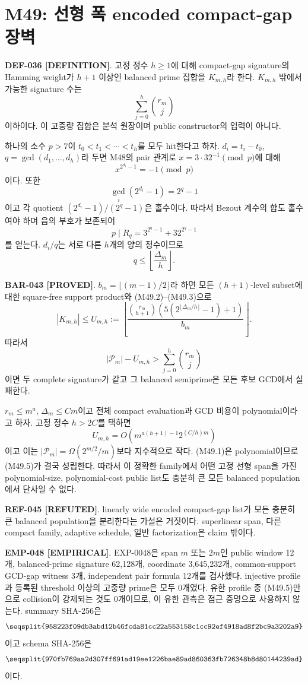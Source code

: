 \documentclass[11pt]{article}
\newcommand{\claimstatus}[2]{\textbf{#1 [#2]}}
\begin{document}
\section{M49: 선형 폭 encoded compact-gap 장벽}

\claimstatus{DEF-036}{DEFINITION}.
고정 정수 \(h\ge1\)에 대해 compact-gap signature의 Hamming weight가
\(h+1\) 이상인 balanced prime 집합을 \(K_{m,h}\)라 한다.
\(K_{m,h}\) 밖에서 가능한 signature 수는
\[
\sum_{j=0}^{h}\binom{r_m}{j}
\tag{M49.1}
\]
이하이다. 이 고중량 집합은 분석 원장이며 public constructor의
입력이 아니다.

하나의 소수 \(p>7\)이
\(t_0<t_1<\cdots<t_h\)를 모두 hit한다고 하자.
\(d_i=t_i-t_0\), \(q=\gcd(d_1,\ldots,d_h)\)라 두면 M48의 pair
관계로 \(x=3\cdot32^{-1}\pmod p\)에 대해
\[
x^{2^{d_i}-1}=-1\pmod p
\]
이다. 또한
\[
\gcd_i(2^{d_i}-1)=2^q-1
\]
이고 각 quotient \((2^{d_i}-1)/(2^q-1)\)은 홀수이다. 따라서
Bezout 계수의 합도 홀수여야 하며 음의 부호가 보존되어
\[
p\mid R_q=3^{2^q-1}+32^{2^q-1}
\tag{M49.2}
\]
를 얻는다. \(d_i/q\)는 서로 다른 \(h\)개의 양의 정수이므로
\[
q\le\left\lfloor\frac{\Delta_m}{h}\right\rfloor.
\tag{M49.3}
\]

\claimstatus{BAR-043}{PROVED}.
\(b_m=\lfloor(m-1)/2\rfloor\)라 하면 모든 \((h+1)\)-level subset에
대한 square-free support product와 (M49.2)--(M49.3)으로
\[
|K_{m,h}|
\le U_{m,h}:=
\left\lfloor
\frac{\binom{r_m}{h+1}
\left(5(2^{\lfloor\Delta_m/h\rfloor}-1)+1\right)}
{b_m}
\right\rfloor.
\tag{M49.4}
\]
따라서
\[
|\mathcal P_m|-U_{m,h}>
\sum_{j=0}^{h}\binom{r_m}{j}
\tag{M49.5}
\]
이면 두 complete signature가 같고 그 balanced semiprime은 모든
후보 GCD에서 실패한다.

\(r_m\le m^a\), \(\Delta_m\le Cm\)이고 전체 compact evaluation과
GCD 비용이 polynomial이라고 하자. 고정 정수 \(h>2C\)를 택하면
\[
U_{m,h}
=O\!\left(m^{a(h+1)-1}2^{(C/h)m}\right)
\]
이고 이는
\(|\mathcal P_m|=\Omega(2^{m/2}/m)\)보다 지수적으로 작다.
(M49.1)은 polynomial이므로 (M49.5)가 결국 성립한다. 따라서 이
정확한 family에서 어떤 고정 선형 span을 가진 polynomial-size,
polynomial-cost public list도 충분히 큰 모든 balanced population에서
단사일 수 없다.

\claimstatus{REF-045}{REFUTED}.
linearly wide encoded compact-gap list가 모든 충분히 큰 balanced
population을 분리한다는 가설은 거짓이다. superlinear span, 다른
compact family, adaptive schedule, 일반 factorization은 claim 밖이다.

\claimstatus{EMP-048}{EMPIRICAL}.
EXP-0048은 span \(m\) 또는 \(2m\)인 public window 12개,
balanced-prime signature 62,128개, coordinate 3,645,232개,
common-support GCD-gap witness 3개, independent pair formula 12개를
검사했다. injective profile과 등록된 threshold 이상의 고중량 prime은
모두 0개였다. 유한 profile 중 (M49.5)만으로 collision이 강제되는
것도 0개이므로, 이 유한 관측은 점근 증명으로 사용하지 않는다.
summary SHA-256은
\[
\texttt{\seqsplit{958223f09db3abd12b46fcda81cc22a553158c1cc92ef4918ad8f2bc9a3202a9}}
\]
이고 schema SHA-256은
\[
\texttt{\seqsplit{970fb769aa2d307ff691ad19ee1226bae89ad860363fb726348b8d80144239ad}}
\]
이다.
\end{document}
